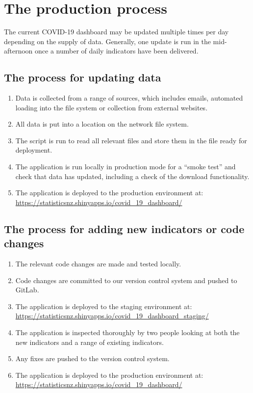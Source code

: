 \documentclass[12pt]{article}
\begin{document}
\section{The production process}

The current COVID-19 dashboard may be updated multiple times per day depending on the supply of data.  Generally, one update is run in the mid-afternoon once a number of daily indicators have been delivered.

\subsection{The process for updating data}
\begin{enumerate}
\item Data is collected from a range of sources, which includes emails, automated loading into the file system or collection from external websites.
\item All data is put into a location on the network file system.
\item The script  is run to read all relevant files and store them in the  file ready for deployment.
\item The application is run locally in production mode for a ``smoke test'' and check that data has updated, including a check of the download functionality.
\item The application is deployed to the production environment at:\\
\url{https://statisticsnz.shinyapps.io/covid\_19\_dashboard/}
\end{enumerate}

\subsection{The process for adding new indicators or code changes}
\begin{enumerate}
\item The relevant code changes are made and tested locally.
\item Code changes are committed to our version control system and pushed to GitLab.
\item The application is deployed to the staging environment at:\\
\url{https://statisticsnz.shinyapps.io/covid\_19\_dashboard\_staging/}
\item The application is inspected thoroughly by two people looking at both the new indicators and a range of existing indicators.
\item Any fixes are pushed to the version control system.
\item The application is deployed to the production environment at:\\
\url{https://statisticsnz.shinyapps.io/covid\_19\_dashboard/}
\end{enumerate}





\clearpage%
\thispagestyle{empty}
\end{document}
